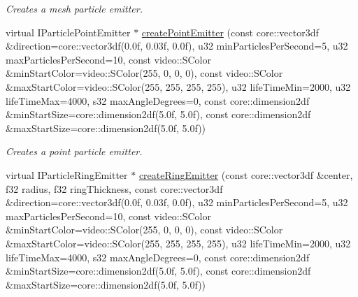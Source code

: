 \begin{DoxyCompactItemize}
\begin{DoxyCompactList}\small\item\em Creates a mesh particle emitter. \end{DoxyCompactList}\item 
\hypertarget{classirr_1_1scene_1_1_c_particle_system_scene_node_a73be7a29fd83b5b51424508e89a7f40f}{virtual I\-Particle\-Point\-Emitter $\ast$ \hyperlink{classirr_1_1scene_1_1_c_particle_system_scene_node_a73be7a29fd83b5b51424508e89a7f40f}{create\-Point\-Emitter} (const core\-::vector3df \&direction=core\-::vector3df(0.\-0f, 0.\-03f, 0.\-0f), u32 min\-Particles\-Per\-Second=5, u32 max\-Particles\-Per\-Second=10, const video\-::\-S\-Color \&min\-Start\-Color=video\-::\-S\-Color(255, 0, 0, 0), const video\-::\-S\-Color \&max\-Start\-Color=video\-::\-S\-Color(255, 255, 255, 255), u32 life\-Time\-Min=2000, u32 life\-Time\-Max=4000, s32 max\-Angle\-Degrees=0, const core\-::dimension2df \&min\-Start\-Size=core\-::dimension2df(5.\-0f, 5.\-0f), const core\-::dimension2df \&max\-Start\-Size=core\-::dimension2df(5.\-0f, 5.\-0f))}\label{classirr_1_1scene_1_1_c_particle_system_scene_node_a73be7a29fd83b5b51424508e89a7f40f}

\begin{DoxyCompactList}\small\item\em Creates a point particle emitter. \end{DoxyCompactList}\item 
\hypertarget{classirr_1_1scene_1_1_c_particle_system_scene_node_a8b4509215a571258732a63c28f176012}{virtual I\-Particle\-Ring\-Emitter $\ast$ \hyperlink{classirr_1_1scene_1_1_c_particle_system_scene_node_a8b4509215a571258732a63c28f176012}{create\-Ring\-Emitter} (const core\-::vector3df \&center, f32 radius, f32 ring\-Thickness, const core\-::vector3df \&direction=core\-::vector3df(0.\-0f, 0.\-03f, 0.\-0f), u32 min\-Particles\-Per\-Second=5, u32 max\-Particles\-Per\-Second=10, const video\-::\-S\-Color \&min\-Start\-Color=video\-::\-S\-Color(255, 0, 0, 0), const video\-::\-S\-Color \&max\-Start\-Color=video\-::\-S\-Color(255, 255, 255, 255), u32 life\-Time\-Min=2000, u32 life\-Time\-Max=4000, s32 max\-Angle\-Degrees=0, const core\-::dimension2df \&min\-Start\-Size=core\-::dimension2df(5.\-0f, 5.\-0f), const core\-::dimension2df \&max\-Start\-Size=core\-::dimension2df(5.\-0f, 5.\-0f))}\label{classirr_1_1scene_1_1_c_particle_system_scene_node_a8b4509215a571258732a63c28f176012}


\end{DoxyCompactItemize}
